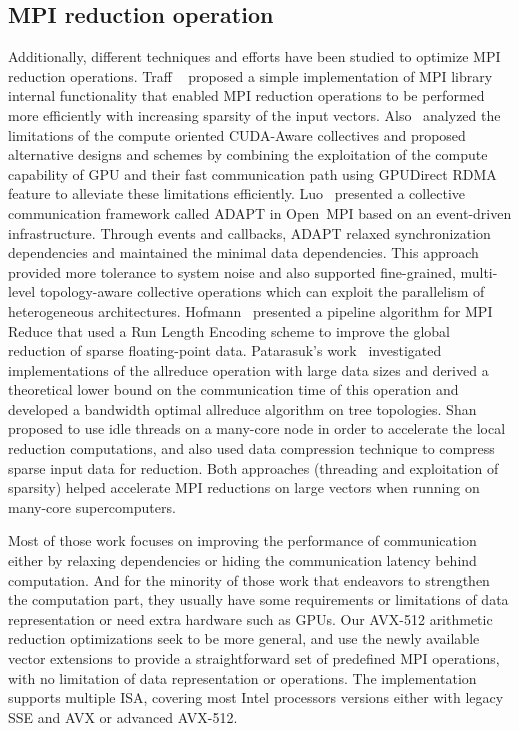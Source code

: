 \documentclass[5p,times,twocolumn]{elsarticle}
\newcommand{\ompi}[0]{Open~MPI\xspace}
\newcommand{\mpi}[0]{\textsc{MPI}\xspace}
\begin{document}
\subsection{\mpi reduction operation}
Additionally, different techniques and
efforts have been studied to optimize \mpi reduction operations. Traff
~\cite{NeutralMPIReduction} proposed a simple implementation of MPI library
internal functionality that enabled MPI reduction operations to be performed
more efficiently with increasing sparsity of the input vectors.
%
Also~\cite{gpu-reduce} analyzed the limitations of the compute oriented CUDA-Aware
collectives and proposed alternative designs and schemes by combining the exploitation of the
compute capability of GPU and their fast communication
path using GPUDirect RDMA feature to alleviate these limitations efficiently.
%
Luo~\cite{Luo-adapt} presented a collective communication framework called ADAPT
in \ompi based on an event-driven infrastructure. Through events and callbacks,
ADAPT relaxed synchronization dependencies and maintained the minimal data dependencies.
This approach provided more tolerance to system noise and also supported fine-grained,
multi-level topology-aware collective operations which can exploit the
parallelism of heterogeneous architectures.
%
Hofmann~\cite{sparse-reduction} presented a pipeline algorithm for MPI Reduce
that used a Run Length Encoding scheme to improve the global reduction of sparse
floating-point data.
Patarasuk's work~\cite{allreduce-optimal} investigated implementations of the allreduce operation
with large data sizes and derived a theoretical lower bound on the communication time of this operation and developed
a bandwidth optimal allreduce algorithm on tree topologies.
%
Shan~\cite{shan-reduce} proposed to use idle threads on a many-core node in order to accelerate
the local reduction computations, and also used data compression technique to compress sparse input data for reduction.
Both approaches (threading and exploitation
of sparsity) helped accelerate MPI reductions on large vectors when
running on many-core supercomputers.
%

Most of those work focuses on improving the performance of
communication either by relaxing dependencies or hiding the communication latency behind computation.
And for the minority of those work that endeavors to strengthen the computation part,
they usually have some requirements or limitations of data
representation or need extra hardware such as GPUs.
Our AVX-512 arithmetic reduction
optimizations seek to be more general, and use the newly available vector extensions to provide a
straightforward set of predefined MPI operations, with no limitation of data representation or operations.
The implementation supports multiple ISA, covering most Intel processors versions either with legacy SSE and AVX or advanced AVX-512.
\end{document}
